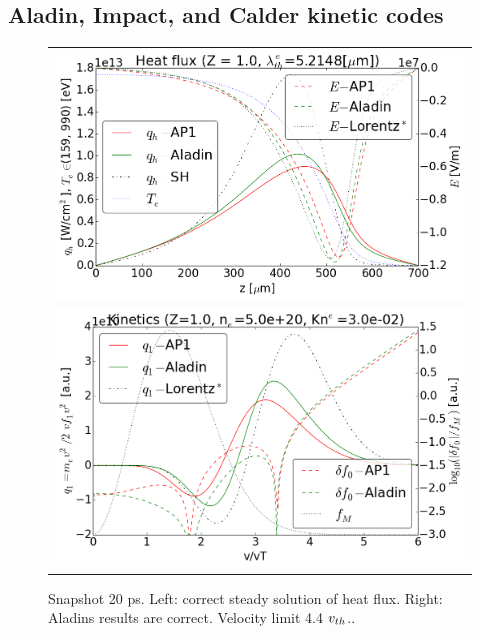 \subsection{Aladin, Impact, and Calder kinetic codes}
\label{sec:AladinImpactCaldercodes}

\begin{figure}[tbh]
  \begin{center}
    \begin{tabular}{c}
      \includegraphics[width=\figscale\textwidth]{../VFPdata/C7_Aladin_case5_heatflux.png} \\
      \includegraphics[width=\figscale\textwidth]{../VFPdata/C7_Aladin_case5_kinetics.png}
    \end{tabular}
  \caption{  
  Snapshot 20 ps. Left: correct steady solution of heat flux. 
  Right: Aladins results are correct. Velocity limit 4.4 $v_{th}$..
  }
  \end{center}
  \label{fig:C7_Aladin_case5}
\end{figure}

